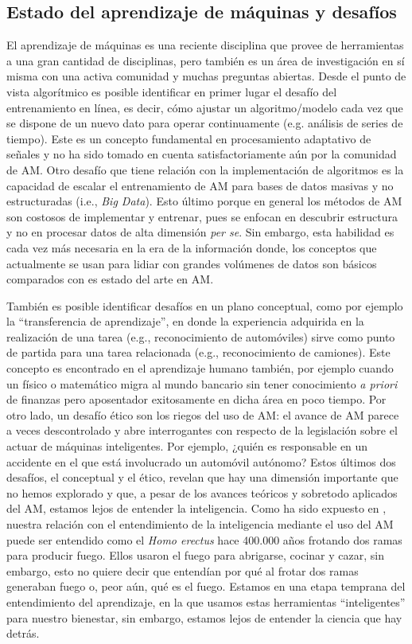 \subsection{Estado del aprendizaje de máquinas y desafíos}

El aprendizaje de máquinas es una reciente disciplina que provee de herramientas a una gran cantidad de disciplinas, pero también es un área de investigación en sí misma con una activa comunidad y muchas preguntas abiertas. Desde el punto de vista algorítmico es posible identificar en primer lugar el desafío del entrenamiento en línea, es decir, cómo ajustar un algoritmo/modelo cada vez que se dispone de un nuevo dato para operar continuamente (e.g. análisis de series de tiempo). Este es un concepto fundamental en procesamiento adaptativo de señales y no ha sido tomado en cuenta satisfactoriamente aún por la comunidad de AM. Otro desafío que tiene relación con la implementación de algoritmos es la capacidad de escalar el entrenamiento de AM para bases de datos masivas y no estructuradas (i.e., \emph{Big Data}). Esto último porque en general los métodos de AM son costosos de implementar y entrenar, pues se enfocan en descubrir estructura y no en procesar datos de alta dimensión \emph{per se}. Sin embargo, esta habilidad es cada vez más necesaria en la era de la información donde, los conceptos que actualmente se usan para lidiar con grandes volúmenes de datos son básicos comparados con es estado del arte en AM.

También es posible identificar desafíos en un plano conceptual, como por ejemplo la ``transferencia de aprendizaje'', en donde la experiencia adquirida en la realización de una tarea (e.g., reconocimiento de automóviles) sirve como punto de partida para una tarea relacionada (e.g., reconocimiento de camiones). Este concepto es encontrado en el aprendizaje humano también, por ejemplo cuando un físico o matemático migra al mundo bancario sin tener conocimiento \emph{a priori} de finanzas pero aposentador exitosamente en dicha área en poco tiempo. Por otro lado, un desafío ético son los riegos del uso de AM: el avance de AM parece a veces descontrolado y abre interrogantes con respecto de la legislación sobre el actuar de máquinas inteligentes. Por ejemplo, ¿quién es responsable en un accidente en el que está involucrado un automóvil autónomo? Estos últimos dos desafíos, el conceptual y el ético, revelan que hay una dimensión importante que no hemos explorado y que, a pesar de los avances teóricos y sobretodo aplicados del AM, estamos lejos de entender la inteligencia. Como ha sido expuesto en \cite{gal_2016}, nuestra relación con el entendimiento de la inteligencia mediante el uso del AM puede ser entendido como el \emph{Homo erectus} hace 400.000 años frotando dos ramas para producir fuego. Ellos usaron el fuego para abrigarse, cocinar y cazar, sin embargo, esto no quiere decir que entendían por qué al frotar dos ramas generaban fuego o, peor aún, qué es el fuego. Estamos en una etapa temprana del entendimiento del aprendizaje, en la que usamos estas herramientas “inteligentes” para nuestro bienestar, sin embargo, estamos lejos de entender la ciencia que hay detrás. 
    
